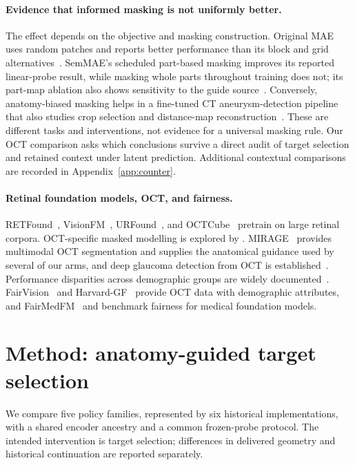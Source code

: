 \documentclass{article}
\begin{document}
\paragraph{Evidence that informed masking is not uniformly better.}
The effect depends on the objective and masking construction. Original MAE
uses random patches and reports better performance than its block and grid
alternatives~\citep{he2022mae}. SemMAE's scheduled part-based masking improves
its reported linear-probe result, while masking whole parts throughout training
does not; its part-map ablation also shows sensitivity to the guide
source~\citep{li2022semmae}. Conversely, anatomy-biased masking helps in a
fine-tuned CT aneurysm-detection pipeline that also studies crop selection and
distance-map reconstruction~\citep{ceballosarroyo2026anatomymae}. These are
different tasks and interventions, not evidence for a universal masking rule.
Our OCT comparison asks which conclusions survive a direct audit of target
selection and retained context under latent prediction. Additional contextual
comparisons are recorded in Appendix~\ref{app:counter}.

\paragraph{Retinal foundation models, OCT, and fairness.}
RETFound~\citep{zhou2023retfound}, VisionFM~\citep{qiu2024visionfm},
URFound~\citep{yu2024urfound}, and OCTCube~\citep{liu2026octcube} pretrain on
large retinal corpora. OCT-specific masked modelling is explored by
\citet{pissas2024octmim}. MIRAGE~\citep{morano2025mirage} provides multimodal
OCT segmentation and supplies the anatomical guidance used by several of our
arms, and deep glaucoma detection from OCT is
established~\citep{maetschke2019glaucoma,ran2019glaucoma,noury2022glaucoma}.
Performance disparities across demographic groups are widely
documented~\citep{seyyedkalantari2021underdiagnosis,larrazabal2020gender,gichoya2022race}.
FairVision~\citep{luo2024fairvision} and Harvard-GF~\citep{luo2024harvardgf}
provide OCT data with demographic attributes, and
FairMedFM~\citep{jin2024fairmedfm} and \citet{shi2025equitable} benchmark
fairness for medical foundation models.

\section{Method: anatomy-guided target selection}
\label{sec:policies}

We compare five policy families, represented by six historical implementations,
with a shared encoder ancestry and a common
frozen-probe protocol. The intended intervention is target selection; differences
in delivered geometry and historical continuation are reported separately.
\end{document}
